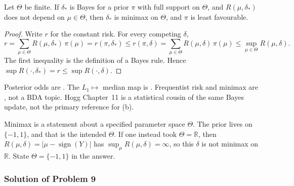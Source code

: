 \documentclass[11pt,a4paper]{article}
\begin{document}
\begin{theorem}
\label{thm:constant-risk-bayes}
Let \(\Theta\) be finite. If \(\delta_*\) is Bayes for a prior \(\pi\) with full support on \(\Theta\), and \(R(\mu,\delta_*)\) does not depend on \(\mu\in\Theta\), then \(\delta_*\) is minimax on \(\Theta\), and \(\pi\) is least favourable.
\end{theorem}

\begin{proof}
Write \(r\) for the constant risk. For every competing \(\delta\),
\[
r
=
\sum_{\mu\in\Theta} R(\mu,\delta_*)\,\pi(\mu)
=
r(\pi,\delta_*)
\le
r(\pi,\delta)
=
\sum_{\mu\in\Theta} R(\mu,\delta)\,\pi(\mu)
\le
\sup_{\mu\in\Theta} R(\mu,\delta).
\]
The first inequality is the definition of a Bayes rule. Hence \(\sup R(\cdot,\delta_*)=r\le\sup R(\cdot,\delta)\).
\end{proof}

\begin{remark}
\label{rem:p9-books}
Posterior odds are \citep[\S1.3]{gelman2013}. The \(L_1\mapsto\) median map is \citep{gelmannotes}. Frequentist risk and minimax are \citep[\S7.1]{hogg2019}, not a BDA topic. Hogg Chapter~11 is a statistical cousin of the same Bayes update, not the primary reference for (b).
\end{remark}

\begin{remark}
\label{rem:p9-theta}
Minimax is a statement about a specified parameter space \(\Theta\). The prior lives on \(\{-1,1\}\), and that is the intended \(\Theta\). If one instead took \(\Theta=\mathbb{R}\), then \(R(\mu,\delta)=|\mu-\operatorname{sign}(Y)|\) has \(\sup_{\mu}R(\mu,\delta)=\infty\), so this \(\delta\) is not minimax on \(\mathbb{R}\). State \(\Theta=\{-1,1\}\) in the answer.
\end{remark}

\subsubsection{Solution of Problem 9}
\end{document}
